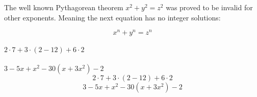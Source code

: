 \documentclass{article}
\begin{document}
The well known Pythagorean theorem \(x^2 + y^2 = z^2\) was 
proved to be invalid for other exponents. 
Meaning the next equation has no integer solutions:

\[ x^n + y^n = z^n \]
\\
\noindent
$2 \cdot 7 + 3 \cdot (2 - 12) + 6 \cdot 2$
\\
\\
$3 - 5x + x^2 - 30(x+3x^2) - 2$
\[2 \cdot 7 + 3 \cdot (2 - 12) + 6 \cdot 2\]
\[3 - 5x + x^2 - 30(x+3x^2) - 2\]
\end{document}
